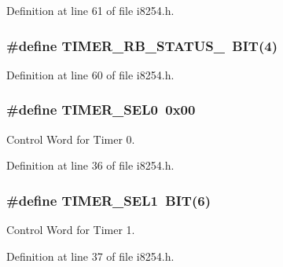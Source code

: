Definition at line 61 of file i8254.\+h.

\hypertarget{group__i8254_ga08b4952bb7058684a3f8f66be04dd45e}{}
\subsubsection[{T\+I\+M\+E\+R\+\_\+\+R\+B\+\_\+\+S\+T\+A\+T\+U\+S\+\_\+}]{\setlength{\rightskip}{0pt plus 5cm}\#define T\+I\+M\+E\+R\+\_\+\+R\+B\+\_\+\+S\+T\+A\+T\+U\+S\+\_\+~{\bf B\+I\+T}(4)}\label{group__i8254_ga08b4952bb7058684a3f8f66be04dd45e}


Definition at line 60 of file i8254.\+h.

\hypertarget{group__i8254_ga6a4822642d40c248435692324a818010}{}
\subsubsection[{T\+I\+M\+E\+R\+\_\+\+S\+E\+L0}]{\setlength{\rightskip}{0pt plus 5cm}\#define T\+I\+M\+E\+R\+\_\+\+S\+E\+L0~0x00}\label{group__i8254_ga6a4822642d40c248435692324a818010}


Control Word for Timer 0. 



Definition at line 36 of file i8254.\+h.

\hypertarget{group__i8254_ga8349623fd8d99f9cc5d8ae29d78594fc}{}
\subsubsection[{T\+I\+M\+E\+R\+\_\+\+S\+E\+L1}]{\setlength{\rightskip}{0pt plus 5cm}\#define T\+I\+M\+E\+R\+\_\+\+S\+E\+L1~{\bf B\+I\+T}(6)}\label{group__i8254_ga8349623fd8d99f9cc5d8ae29d78594fc}


Control Word for Timer 1. 



Definition at line 37 of file i8254.\+h.

\hypertarget{group__i8254_ga142a255de0dbc48aeabd45fc10c33672}{}

